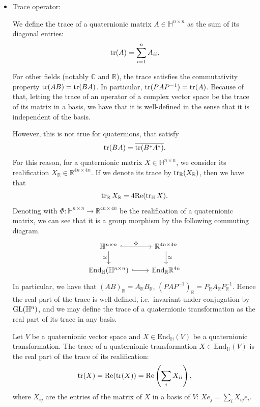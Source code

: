 \documentclass{report}
\begin{document}
\begin{itemize}
\begin{proposition}
    \end{proposition}
    \item Trace operator:
    \begin{definition}
        We define the trace of a quaternionic matrix $A \in \mathbb H^{n \times n}$ as the sum of its diagonal entries:
        \[
        \operatorname{tr}(A) = \sum_{i=1}^n A_{ii}.
        \]
    \end{definition}
    For other fields (notably $\mathbb C$ and $\mathbb R$), the trace satisfies the commutativity property $\operatorname{tr}(AB) = \operatorname{tr}(BA)$. In particular, $\operatorname{tr}(PAP^{-1}) = \operatorname{tr}(A)$.
    Because of that, letting the trace of an operator of a complex vector space be the trace of its matrix in a basis, we have that it is well-defined in the sense that it is independent of the basis. 
    
    However, this is not true for quaternions, that satisfy
    \[
    \operatorname{tr}(B A) = \overline{\operatorname{tr}(B^* A^*)}.
    \]
    For this reason, for a quaternionic matrix $X \in \mathbb H^{n \times n}$, we consider its realification $X_\mathbb R \in \mathbb R^{4n \times 4n}$.
    If we denote its trace by $\operatorname{tr}_\mathbb R(X_\mathbb R)$, then we have that
    \[
    \operatorname{tr}_\mathbb R X_\mathbb R = 4 \mathrm{Re}(\operatorname{tr}_\mathbb H X).
    \]
    Denoting with $\Phi: \mathbb H^{n\times n} \to \mathbb R^{4n \times 4n}$ be the realification of a quaternionic matrix, we can see that it is a group morphism by the following commuting diagram.
    \[
    \begin{tikzcd}
        \mathbb H^{n \times n} \arrow[hookrightarrow, r, "\Phi"] \arrow[d, "\simeq"'] & \mathbb R^{4n \times 4n} \arrow[d, "\simeq"] \\
        \mathrm{End}_\mathbb H (\mathbb H^{n \times n}) \arrow[hookrightarrow, r] & \mathrm{End}_\mathbb R\mathbb R^{4n}
    \end{tikzcd}
    \]    
    In particular, we have that $(AB)_\mathbb R = A_\mathbb R B_\mathbb R$, $(PAP^{-1})_\mathbb R = P_\mathbb R A_\mathbb R P_\mathbb R^{-1}$.
    Hence the real part of the trace is well-defined, i.e.\ invariant under conjugation by $\operatorname{{\mathrm{GL}}}(\mathbb H^n)$, and we may define the trace of a quaternionic transformation as the real part of its trace in any basis.
    \begin{definition}
        Let $V$ be a quaternionic vector space and $X \in \mathrm{End}_\mathbb H(V)$ be a quaternionic transformation.
        The trace of a quaternionic transformation $X \in \mathrm{End}_\mathbb H(V)$ is the real part of the trace of its realification:
        \[
        \operatorname{tr}(X) = \mathrm{Re}(\operatorname{tr}(X)) = \mathrm{Re}\left(\sum_i X_{ii}\right),
        \]
        where $X_{ij}$ are the entries of the matrix of $X$ in a basis of $V$: $Xe_j = \sum_i X_{ij} e_i$.
    \end{definition}
\end{itemize}
\end{document}
